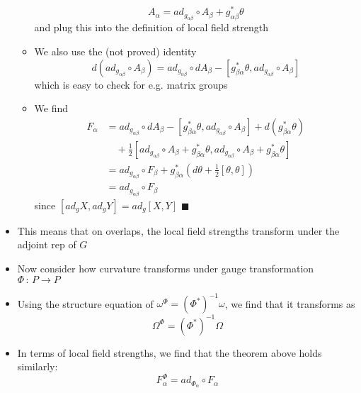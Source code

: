 \documentclass[12pt,a4paper]{article}
\numberwithin{equation}{section}
\begin{document}
\begin{itemize}
\begin{itemize}
			$$
			A_{\alpha}=ad_{g_{\alpha\beta}}\circ A_{\beta}+g_{\alpha\beta}^{*}\theta
			$$
			and plug this into the definition of local field strength
			\item We also use the (not proved) identity
			$$
			d(ad_{g_{\alpha\beta}}\circ A_{\beta})=ad_{g_{\alpha\beta}}\circ dA_{\beta}-[g_{\beta\alpha}^{*}\theta,ad_{g_{\alpha\beta}}\circ A_{\beta}]
			$$
			which is easy to check for e.g. matrix groups
			\item We find
			$$
			\begin{aligned}
				F_{\alpha}&=ad_{g_{\alpha\beta}}\circ dA_{\beta}-[g_{\beta\alpha}^{*}\theta,ad_{g_{\alpha\beta}}\circ A_{\beta}]+d(g_{\beta\alpha}^{*}\theta)\\&\quad+\tfrac{1}{2}[ad_{g_{\alpha\beta}}\circ A_{\beta}+g_{\beta\alpha}^{*}\theta,ad_{g_{\alpha\beta}}\circ A_{\beta}+g_{\beta\alpha}^{*}\theta]\\&=ad_{g_{\alpha\beta}}\circ F_{\beta}+g_{\beta\alpha}^{*}(d\theta+\tfrac{1}{2}[\theta,\theta])\\&=ad_{g_{\alpha\beta}}\circ F_{\beta}
			\end{aligned}
			$$
			since $[ad_{g}X,ad_{g}Y]=ad_{g}[X,Y]$ $\blacksquare$
		\end{itemize}
		\item This means that on overlaps, the local field strengths transform under the adjoint rep of $G$
		\item Now consider how curvature transforms under gauge transformation $\Phi\,:\,P\to P$
		\item Using the structure equation of $\omega^{\Phi}=(\Phi^{*})^{-1}\omega$, we find that it transforms as
		\begin{equation}
			\Omega^{\Phi}=(\Phi^{*})^{-1}\Omega
		\end{equation}
		\item In terms of local field strengths, we find that the theorem above holds similarly:
		\begin{equation}
			F_{\alpha}^{\Phi}=ad_{\Phi_{\alpha}}\circ F_{\alpha}
		\end{equation}
	\end{itemize}
\end{document}
